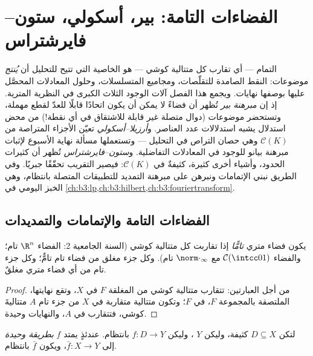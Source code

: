 \chapter{الفضاءات التامة: بير، أسكولي، ستون--فايرشتراس}
\label{ch:b3:complete}

التمام --- أي تقارب كل متتالية كوشي --- هو الخاصية التي تتيح
للتحليل أن \emph{يُنتج} موضوعات: النقط الصامدة للتقلّصات، ومجاميع
المتسلسلات، وحلول المعادلات المحصَّل عليها بوصفها نهايات. ويجمع
هذا الفصل آلات الوجود الثلاث الكبرى في النظرية المترية.
إذ إن \emph{مبرهنة بير} تُظهر أن فضاءً  لا يمكن أن يكون اتحادًا
قابلًا للعدّ لقطع مهملة، وتستحضر موضوعات (دوال متصلة غير قابلة
للاشتقاق في أي نقطة!) من محض استدلال يشبه استدلالات عدد العناصر.
و\emph{أرزيلا--أسكولي} تعيّن الأجزاء المتراصة من $\mathcal C(K)$
وهي حصان التراص في التحليل --- وتستعملها مسألة نهاية الأسبوع
لإثبات مبرهنة بيانو للوجود في المعادلات التفاضلية.
و\emph{ستون--فايرشتراس} تُظهر أن كثيرات الحدود، وأشياء أخرى
كثيرة، كثيفةٌ في $\mathcal C(K)$: فيصير التقريب تحقّقًا جبريًا.
وفي الطريق نبني الإتمامات ونبرهن على مبرهنة التمديد للتطبيقات
المتصلة بانتظام، وهي الخبز اليومي في \cref{ch:b3:lp,ch:b3:hilbert,ch:b3:fouriertransform}.

\section{الفضاءات التامة والإتمامات والتمديدات}

\begin{definition}\label{def:b3:complete:complete}
يكون فضاء متري \emph{تامًّا} إذا تقاربت كل
متتالية كوشي (السنة الجامعية 2: الفضاء $\R^n$ تام؛ والفضاء
$\mathcal C(\intcc01)$ مع $\norm\cdot_\infty$ تام). وكل جزء مغلق من فضاء تام تامٌّ؛ وكل جزء تام
من أي فضاء متري مغلقٌ.
\end{definition}

\begin{proof}
من أجل العبارتين: تتقارب متتالية كوشي من المغلقة $F$ في $X$،
وتقع نهايتها، الملتصقة بالمجموعة $F$، في $F$؛ وتكون متتالية متقاربة في
$X$ من جزء تام $A$ متتاليةَ كوشي، فتتقارب في $A$، والنهايات
وحيدة.
\end{proof}

\begin{theorem}
\label{thm:b3:complete:extension}
لتكن $D \subseteq X$ كثيفة، وليكن $Y$ ، وليكن $f \colon D \to
Y$ 
بانتظام. عندئذٍ يمتد $f$ \emph{بطريقة وحيدة} إلى 
$\bar f \colon X \to Y$، ويكون $\bar f$  بانتظام.
\end{theorem}

